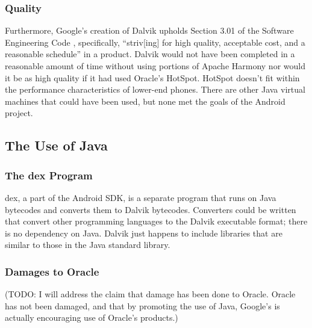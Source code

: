 \documentclass[11pt]{article}
\begin{document}
\begin{multicols}{2}

\subsubsection{Quality} %
\label{ssub:quality}

Furthermore, Google's creation of Dalvik upholds Section 3.01 of the Software
Engineering Code \cite{secode}, specifically, ``striv[ing] for high quality,
acceptable cost, and a reasonable schedule'' in a product.  Dalvik would not
have been completed in a reasonable amount of time without using portions of
Apache Harmony nor would it be as high quality if it had used Oracle's HotSpot.
HotSpot doesn't fit within the performance characteristics of lower-end phones.
There are other Java virtual machines that could have been used, but none met
the goals of the Android project.



\subsection{The Use of Java} %
\label{sub:java}

\subsubsection{The dex Program} %
\label{ssub:dex}

dex, a part of the Android SDK, is a separate program that runs on Java
bytecodes and converts them to Dalvik bytecodes.  Converters could be
written that convert other programming languages to the Dalvik executable
format; there is no dependency on Java.  Dalvik just happens to include
libraries that are similar to those in the Java standard library.


\subsubsection{Damages to Oracle} %
\label{ssub:oracle-damage}

(TODO: I will address the claim that damage has been done to Oracle.  Oracle has
not been damaged, and that by promoting the use of Java, Google's is actually
encouraging use of Oracle's products.)



\end{multicols}
\end{document}
